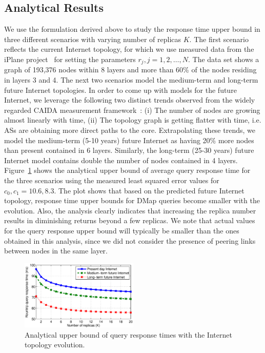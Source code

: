 \subsection{Analytical Results}

 We use the formulation derived above to study the response time upper bound in three different scenarios with varying number of replicas $K$. The first scenario reflects the current Internet topology, for which we use measured data from the iPlane project~\cite{madhyastha} for setting the parameters $r_j, j = 1,2,\ldots, N$. The data set shows a graph of 193,376 nodes within 8 layers and more than 60\% of the nodes residing in layers 3 and 4. The next two scenarios model the medium-term and long-term future Internet topologies. In order to come up with models for the future Internet, we leverage the following two distinct trends observed from the widely regarded CAIDA measurement framework~\cite{caida-main}: (i) The number of nodes are growing almost linearly with time, (ii) The topology graph is getting flatter with time, i.e. ASs are obtaining more direct paths to the core. Extrapolating these trends, we model the medium-term (5-10 years) future Internet as having 20\% more nodes than present contained in 6 layers. Similarly, the long-term (25-30 years) future Internet model contains double the number of nodes contained in 4 layers. Figure~\ref{fig:resAnalysis} shows the analytical upper bound of average query response time for the three scenarios using the measured least squared error values for ${c_0,c_1} = {10.6,8.3}$. The plot shows that based on the predicted future Internet topology, response time upper bounds for DMap queries become smaller with the evolution. Also, the analysis clearly indicates that increasing the replica number results in diminishing returns beyond a few replicas. We note that actual values for the query response upper bound will typically be smaller than the ones obtained in this analysis, since we did not consider the presence of peering links between nodes in the same layer.\vspace{-0.15in}
\begin{center}
\begin{figure}[t]
\vspace{-0.2in}
\centering
\includegraphics[width=0.5\textwidth]{figures/analysisUpperBound}
\caption{Analytical upper bound of query response times with the Internet topology evolution.}
\label{fig:resAnalysis}
\vspace{-0.2in}
\end{figure}
\end{center} 
